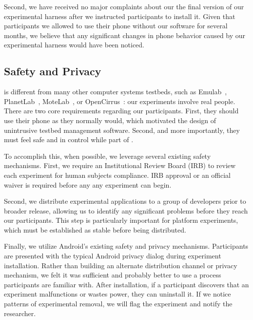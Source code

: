 Second, we have received no major complaints about our the final version of
our \PhoneLab{} experimental harness after we instructed participants to
install it. Given that participants we allowed to use their phone without our
software for several months, we believe that any significant changes in phone
behavior caused by our experimental harness would have been noticed.

\subsection{Safety and Privacy}

\PhoneLab{} is different from many other computer systems testbeds, such as
Emulab~\cite{white:osdi:2002, emulab}, PlanetLab~\cite{peterson:ccr:2003,
planetlab}, MoteLab~\cite{werner-allen:ipsn:2005}, or
OpenCirrus~\cite{avetisyan:computer:2010, opencirrus}: our experiments
involve real people. There are two core requirements regarding our
participants. First, they should use their phone as they normally would,
which motivated the design of unintrusive testbed management software.
Second, and more importantly, they must feel safe and in control while part
of \PhoneLab{}.

To accomplish this, when possible, we leverage several existing safety
mechanisms. First, we require an Institutional Review Board (IRB) to review
each \PhoneLab{} experiment for human subjects compliance. IRB approval or an
official waiver is required before any \PhoneLab{} any experiment can begin.

Second, we distribute experimental applications to a group of developers
prior to broader release, allowing us to identify any significant problems
before they reach our participants. This step is particularly important for
platform experiments, which must be established as stable before being
distributed.

Finally, we utilize Android's existing safety and privacy mechanisms.
Participants are presented with the typical Android privacy dialog during
experiment installation. Rather than building an alternate distribution
channel or privacy mechanism, we felt it was sufficient and probably better
to use a process participants are familiar with. After installation, if a
participant discovers that an experiment malfunctions or wastes power, they
can uninstall it. If we notice patterns of experimental removal, we will flag
the experiment and notify the researcher.




